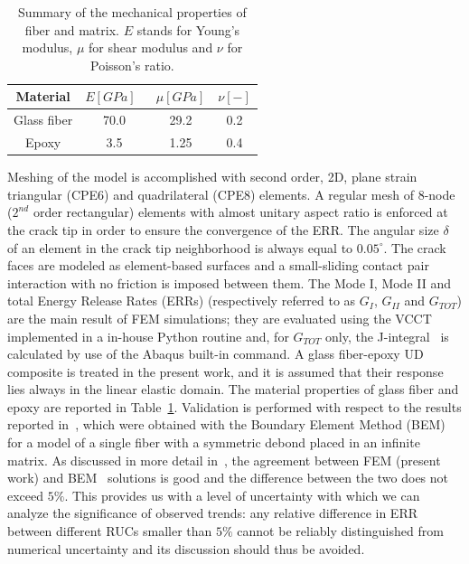 \documentclass[review]{elsarticle}
\begin{document}
\begin{table}[!htbp]
 \centering
 \caption{Summary of the mechanical properties of fiber and matrix. $E$ stands for Young's modulus, $\mu$ for shear modulus and $\nu$ for Poisson's ratio.}
 \begin{tabular}{cccc}
\textbf{Material} & \textbf{$E\left[GPa\right]$}\ & \textbf{$\mu\left[GPa\right]$} & \textbf{$\nu\left[-\right]$} \\
\midrule
Glass fiber    & 70.0  & 29.2   & 0.2  \\
Epoxy    & 3.5    & 1.25   & 0.4
\end{tabular}
\label{tab:phaseprop}
\end{table}

Meshing of the model is accomplished with second order, 2D, plane strain triangular (CPE6) and quadrilateral (CPE8) elements. A regular mesh of 8-node ($2^{nd}$ order rectangular) elements with almost unitary aspect ratio is enforced at the crack tip in order to ensure the convergence of the ERR. The angular size $\delta$ of an element in the crack tip neighborhood is always equal to $0.05^{\circ}$. The crack faces are modeled as element-based surfaces and a small-sliding contact pair interaction with no friction is imposed between them. The Mode I, Mode II and total Energy Release Rates (ERRs) (respectively referred to as $G_{I}$, $G_{II}$ and $G_{TOT}$) are the main result of FEM simulations; they are evaluated using the VCCT~\cite{Krueger2004} implemented in a in-house Python routine and, for $G_{TOT}$ only, the J-integral~\cite{Rice1968} is calculated by use of the Abaqus built-in command. A glass fiber-epoxy UD composite is treated in the present work, and it is assumed that their response lies always in the linear elastic domain. The material properties of glass fiber and epoxy are reported in Table~\ref{tab:phaseprop}. Validation is performed with respect to the results reported in~\cite{Paris2007,Sandino2016}, which were obtained with the Boundary Element Method (BEM) for a model of a single fiber with a symmetric debond placed in an infinite matrix. As discussed in more detail in~\cite{DiStasio2019}, the agreement between FEM (present work) and BEM~\cite{Paris2007,Sandino2016} solutions is good and the difference between the two does not exceed $5\%$. This provides us with a level of uncertainty with which we can analyze the significance of observed trends: any relative difference in ERR between different RUCs smaller than $5\%$ cannot be reliably distinguished from numerical uncertainty and its discussion should thus be avoided.
\end{document}
